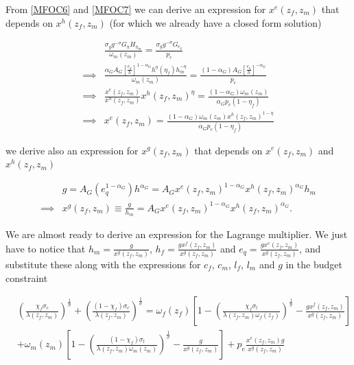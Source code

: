 \documentclass[12pt]{article}
\begin{document}
From \ref{MFOC6} and \ref{MFOC7} we can derive an expression for $x^e(z_f,z_m)$ that depends on $x^h(z_f,z_m)$ (for which we already have a closed form solution)

\begin{align*}
	& \frac{\sigma_g g^{-\sigma}G_h H_{h_m}}{\omega_m(z_m)} = \frac{\sigma_g g^{-\sigma}G_{e_q}}{p_e} \\
	\implies & \frac{\alpha_G A_G \left[\frac{e_q}{h}\right]^{1-\alpha_G} h^{\eta}\left(\eta_f\right)h_m^{-\eta}}{\omega_m(z_m)} = \frac{\left(1-\alpha_G\right) A_G \left[\frac{e_q}{h}\right]^{-\alpha_G}}{p_e} \\
	\implies & \frac{x^e(z_f,z_m)}{x^h(z_f,z_m)}x^h(z_f,z_m)^{\eta}=\frac{\left(1-\alpha_G\right)\omega_m(z_m)}{\alpha_G p_e \left(1-\eta_f\right)} \\
	\implies & x^e(z_f,z_m) = \frac{\left(1-\alpha_G\right)\omega_m(z_m)x^h(z_f,z_m)^{1-\eta}}{\alpha_G p_e \left(1-\eta_f\right)} 
\end{align*}

we derive also an expression for $x^g(z_f,z_m)$ that depends on $x^e(z_f,z_m)$ and $x^h(z_f,z_m)$

\begin{align*}
	& g = A_G\left(e_q^{1-\alpha_G}\right)h^{\alpha_G} = A_G x^e(z_f,z_m)^{1-\alpha_G} x^h(z_f,z_m)^{\alpha_G}h_m \\ \implies & x^g(z_f,z_m)\equiv \frac{g}{h_m} = A_G x^e(z_f,z_m)^{1-\alpha_G} x^h(z_f,z_m)^{\alpha_G}.
\end{align*}

We are almost ready to derive an expression for the Lagrange multiplier. We just have to notice that $h_m=\frac{g}{x^g(z_f,z_m)}$, $h_f=\frac{gx^f(z_f,z_m)}{x^g(z_f,z_m)}$ and $e_q=\frac{gx^e(z_f,z_m)}{x^g(z_f,z_m)}$, and substitute these along with the expressions for $c_f$, $c_m$, $l_f$, $l_m$ and $g$ in the budget constraint

\begin{align*}
	& \left(\frac{\chi_f \sigma_c}{\lambda(z_f,z_m)}\right)^{\frac{1}{\sigma}}+\left(\frac{\left(1-\chi_f\right)\sigma_c}{\lambda(z_f,z_m)}\right)^{\frac{1}{\sigma}}=\omega_f(z_f)\left[1-\left(\frac{\chi_f\sigma_l}{\lambda(z_f,z_m)\omega_f(z_f)}\right)^{\frac{1}{\sigma}}-\frac{gx^f(z_f,z_m)}{x^g(z_f,z_m)}\right] \\ & +\omega_m(z_m)\left[1-\left(\frac{\left(1-\chi_f\right)\sigma_l}{\lambda(z_f,z_m)\omega_m(z_m)}\right)^{\frac{1}{\sigma}}-\frac{g}{x^g(z_f,z_m)}\right]+p_e\frac{x^e(z_f,z_m) g}{x^g(z_f,z_m)}
\end{align*}
\end{document}
